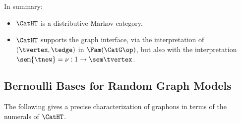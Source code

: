 In summary:
  \begin{itemize}\item $\CatHT$ is a distributive Markov category.
  \item $\CatHT$ supports the graph interface, via
    the interpretation of $(\tvertex,\tedge)$ in $\Fam(\CatG\op)$, but also with the 
    interpretation
    $\sem{\tnew}=\nu:1\to \sem\tvertex$.
  \end{itemize}


\subsection{Bernoulli Bases for Random Graph Models}
\label{sec:bernoulli-base-graphon}
The following gives a precise characterization of graphons in terms of the numerals of $\CatHT$.

